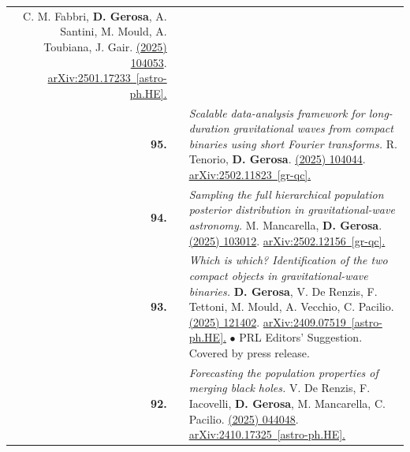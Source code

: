 {\begin{longtable}{rp{0.3cm}p{15.8cm}}
\newline{}
C. M. Fabbri, \textbf{D. Gerosa}, A. Santini, M. Mould, A. Toubiana, J. Gair.
\newline{}
\href{https://journals.aps.org/prd/abstract/10.1103/PhysRevD.111.104053}{\prd 111 (2025) 104053}. \href{https://arxiv.org/abs/2501.17233}{arXiv:2501.17233 [astro-ph.HE].}
\vspace{0.09cm}\\
%
\textbf{95.} & & \textit{Scalable data-analysis framework for long-duration gravitational waves from compact binaries using short Fourier transforms.}
\newline{}
R. Tenorio, \textbf{D. Gerosa}.
\newline{}
\href{https://journals.aps.org/prd/abstract/10.1103/PhysRevD.111.104044}{\prd 111 (2025) 104044}. \href{https://arxiv.org/abs/2502.11823}{arXiv:2502.11823 [gr-qc].}
\vspace{0.09cm}\\
%
\textbf{94.} & & \textit{Sampling the full hierarchical population posterior distribution in gravitational-wave astronomy.}
\newline{}
M. Mancarella, \textbf{D. Gerosa}.
\newline{}
\href{https://journals.aps.org/prd/abstract/10.1103/PhysRevD.111.103012}{\prd 111 (2025) 103012}. \href{https://arxiv.org/abs/2502.12156}{arXiv:2502.12156 [gr-qc].}
\vspace{0.09cm}\\
%
\textbf{93.} & & \textit{Which is which? Identification of the two compact objects in gravitational-wave binaries.}
\newline{}
\textbf{D. Gerosa}, V. De Renzis, F. Tettoni, M. Mould, A. Vecchio, C. Pacilio.
\newline{}
\href{https://journals.aps.org/prl/abstract/10.1103/PhysRevLett.134.121402}{\prl 134 (2025) 121402}. \href{https://arxiv.org/abs/2409.07519}{arXiv:2409.07519 [astro-ph.HE].}
\newline{}
\textcolor{color1}{$\bullet$} PRL Editors' Suggestion. Covered by press release.
\vspace{0.09cm}\\
%
\textbf{92.} & & \textit{Forecasting the population properties of merging black holes.}
\newline{}
V. De Renzis, F. Iacovelli, \textbf{D. Gerosa}, M. Mancarella, C. Pacilio.
\newline{}
\href{https://journals.aps.org/prd/abstract/10.1103/PhysRevD.111.044048}{\prd 111 (2025) 044048}. \href{https://arxiv.org/abs/2410.17325}{arXiv:2410.17325 [astro-ph.HE].}

\end{longtable}}
